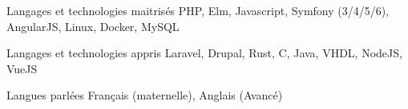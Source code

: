 

\begin{cvskills}

  \cvskill
    {Langages et technologies maitrisés} %
    {PHP, Elm, Javascript, Symfony (3/4/5/6), AngularJS, Linux, Docker, MySQL} %

  \cvskill
    {Langages et technologies appris} %
    {Laravel, Drupal, Rust, C, Java, VHDL, NodeJS, VueJS} %

  \cvskill
    {Langues parlées} %
    {Français (maternelle), Anglais (Avancé)} %
    

\end{cvskills}
